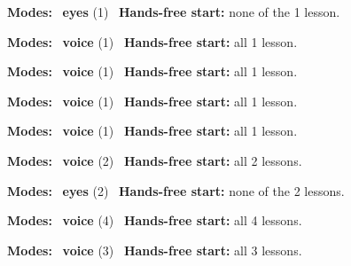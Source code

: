 \expandafter\def\csname hlchaptermodality132\endcsname{%
  {\small\noindent
    \textbf{Modes:} \hlsightsign{}~\textbf{eyes} (1)\quad
    \hlvoicesign{}~\textbf{Hands-free start:} none of the 1 lesson.%
    \par}\medskip
}

\expandafter\def\csname hlchaptermodality133\endcsname{%
  {\small\noindent
    \textbf{Modes:} \hlvoicesign{}~\textbf{voice} (1)\quad
    \hlvoicesign{}~\textbf{Hands-free start:} all 1 lesson.%
    \par}\medskip
}

\expandafter\def\csname hlchaptermodality134\endcsname{%
  {\small\noindent
    \textbf{Modes:} \hlvoicesign{}~\textbf{voice} (1)\quad
    \hlvoicesign{}~\textbf{Hands-free start:} all 1 lesson.%
    \par}\medskip
}

\expandafter\def\csname hlchaptermodality135\endcsname{%
  {\small\noindent
    \textbf{Modes:} \hlvoicesign{}~\textbf{voice} (1)\quad
    \hlvoicesign{}~\textbf{Hands-free start:} all 1 lesson.%
    \par}\medskip
}

\expandafter\def\csname hlchaptermodality136\endcsname{%
  {\small\noindent
    \textbf{Modes:} \hlvoicesign{}~\textbf{voice} (1)\quad
    \hlvoicesign{}~\textbf{Hands-free start:} all 1 lesson.%
    \par}\medskip
}

\expandafter\def\csname hlchaptermodality137\endcsname{%
  {\small\noindent
    \textbf{Modes:} \hlvoicesign{}~\textbf{voice} (2)\quad
    \hlvoicesign{}~\textbf{Hands-free start:} all 2 lessons.%
    \par}\medskip
}

\expandafter\def\csname hlchaptermodality138\endcsname{%
  {\small\noindent
    \textbf{Modes:} \hlsightsign{}~\textbf{eyes} (2)\quad
    \hlvoicesign{}~\textbf{Hands-free start:} none of the 2 lessons.%
    \par}\medskip
}

\expandafter\def\csname hlchaptermodality139\endcsname{%
  {\small\noindent
    \textbf{Modes:} \hlvoicesign{}~\textbf{voice} (4)\quad
    \hlvoicesign{}~\textbf{Hands-free start:} all 4 lessons.%
    \par}\medskip
}

\expandafter\def\csname hlchaptermodality140\endcsname{%
  {\small\noindent
    \textbf{Modes:} \hlvoicesign{}~\textbf{voice} (3)\quad
    \hlvoicesign{}~\textbf{Hands-free start:} all 3 lessons.%
    \par}\medskip
}

